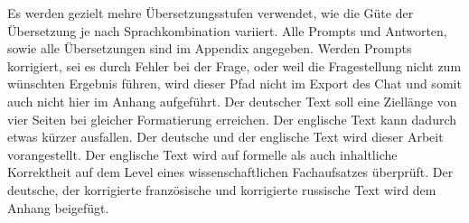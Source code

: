 Es werden gezielt mehre Übersetzungsstufen verwendet, wie die Güte der Übersetzung je nach Sprachkombination variiert. Alle Prompts und Antworten, sowie alle Übersetzungen sind im Appendix angegeben. Werden Prompts korrigiert, sei es durch Fehler bei der Frage, oder weil die Fragestellung nicht zum wünschten Ergebnis führen, wird dieser Pfad nicht im Export des Chat und somit auch nicht hier im Anhang aufgeführt.
Der deutscher Text soll eine Ziellänge von vier Seiten bei gleicher Formatierung erreichen. Der englische Text kann dadurch etwas kürzer ausfallen. Der deutsche und der englische Text wird dieser Arbeit vorangestellt. 
Der englische Text wird auf formelle als auch inhaltliche Korrektheit auf dem Level eines wissenschaftlichen Fachaufsatzes überprüft. Der deutsche, der korrigierte französische und korrigierte russische Text wird dem Anhang beigefügt.
